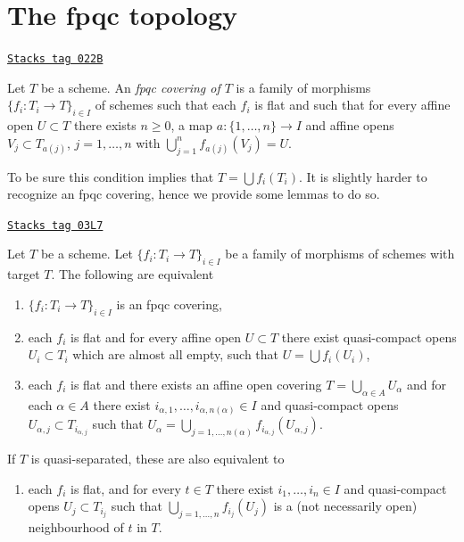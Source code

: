 \section{The fpqc topology}
\label{topologies-section-fpqc}
\begin{definition}
\label{topologies-definition-fpqc-covering}
\href{https://stacks.math.columbia.edu/tag/022B}{\texttt{Stacks tag 022B}}

Let $T$ be a scheme. An {\it fpqc covering of $T$} is a family
of morphisms $\{f_i : T_i \to T\}_{i \in I}$ of schemes
such that each $f_i$ is flat and such that for every affine open
$U \subset T$ there exists $n \geq 0$, a map
$a : \{1, \ldots, n\} \to I$ and affine opens
$V_j \subset T_{a(j)}$, $j = 1, \ldots, n$
with $\bigcup_{j = 1}^n f_{a(j)}(V_j) = U$.
\end{definition}

To be sure this condition implies that $T = \bigcup f_i(T_i)$.
It is slightly harder to recognize an fpqc covering, hence we provide
some lemmas to do so.

\begin{lemma}
\label{topologies-lemma-recognize-fpqc-covering}
\href{https://stacks.math.columbia.edu/tag/03L7}{\texttt{Stacks tag 03L7}}

Let $T$ be a scheme. Let $\{f_i : T_i \to T\}_{i \in I}$ be a family of
morphisms of schemes with target $T$. The following are equivalent
\begin{enumerate}
\item $\{f_i : T_i \to T\}_{i \in I}$ is an fpqc covering,
\item each $f_i$ is flat and for every affine open $U \subset T$
there exist quasi-compact opens
$U_i \subset T_i$ which are almost all empty,
such that $U = \bigcup f_i(U_i)$,
\item each $f_i$ is flat and there exists an affine open covering
$T = \bigcup_{\alpha \in A} U_\alpha$ and for each $\alpha \in A$
there exist $i_{\alpha, 1}, \ldots, i_{\alpha, n(\alpha)} \in I$
and quasi-compact opens $U_{\alpha, j} \subset T_{i_{\alpha, j}}$ such that
$U_\alpha =
\bigcup_{j = 1, \ldots, n(\alpha)} f_{i_{\alpha, j}}(U_{\alpha, j})$.
\end{enumerate}
If $T$ is quasi-separated, these are also equivalent to
\begin{enumerate}
\item[(4)] each $f_i$ is flat, and for every $t \in T$ there exist
$i_1, \ldots, i_n \in I$ and quasi-compact opens $U_j \subset T_{i_j}$
such that $\bigcup_{j = 1, \ldots, n} f_{i_j}(U_j)$ is a
(not necessarily open) neighbourhood of $t$ in $T$.
\end{enumerate}
\end{lemma}

